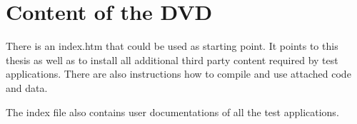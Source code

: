 \chapter{Content of the DVD}

\par
There is an index.htm that could be used as starting point.
It points to this thesis as well as to install all additional third party content required by test applications.
There are also instructions how to compile and use attached code and data.

\par
The index file also contains user documentations of all the test applications.